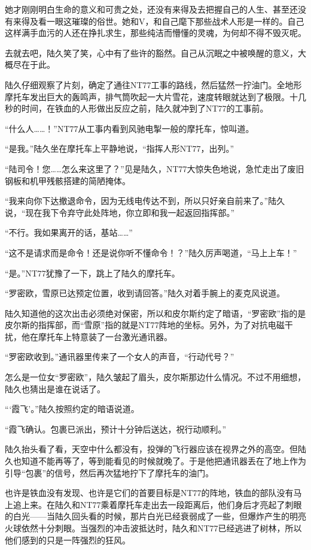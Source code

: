 她才刚刚明白生命的意义和可贵之处，还没有来得及去把握自己的人生、甚至还没有来得及看一眼这璀璨的俗世。她和V，和自己麾下那些战术人形是一样的。自己这样满手血污的人还在挣扎求生，那些纯洁而懵懂的灵魂，为何却不得不毁灭呢。

去就去吧，陆久笑了笑，心中有了些许的豁然。自己从沉眠之中被唤醒的意义，大概尽在于此。

陆久仔细观察了片刻，确定了通往NT77工事的路线，然后猛然一拧油门。全地形摩托车发出巨大的轰鸣声，排气筒吹起一大片雪花，速度转眼就达到了极限。十几秒的时间，在铁血的人形做出反应之前，陆久就冲到了NT77的工事前。

“什么人……！”NT77从工事内看到风驰电掣一般的摩托车，惊叫道。

“是我。”陆久坐在摩托车上平静地说，“指挥人形NT77，出列。”

“陆司令！您……怎么来这里了？”见是陆久，NT77大惊失色地说，急忙走出了废旧钢板和机甲残骸搭建的简陋掩体。

“我来向你下达撤退命令，因为无线电传达不到，所以只好亲自前来了。”陆久说，“现在我下令弃守此处阵地，你立即和我一起返回指挥部。”

“不行。我如果离开的话，基站……”

“这不是请求而是命令！还是说你听不懂命令！？”陆久厉声喝道，“马上上车！”

“是。”NT77犹豫了一下，跳上了陆久的摩托车。

“罗密欧，雪原已达预定位置，收到请回答。”陆久对着手腕上的麦克风说道。

陆久知道他的这次出击必须绝对保密，所以和皮尔斯约定了暗语，“罗密欧”指的是皮尔斯的指挥部，而“雪原”指的就是NT77阵地的坐标。另外，为了对抗电磁干扰，他在摩托车上特意装了一台激光通讯器。

“罗密欧收到。”通讯器里传来了一个女人的声音，“行动代号？”

怎么是一位女“罗密欧”，陆久皱起了眉头，皮尔斯那边什么情况。不过不用细想，陆久也猜出是谁在说话了。

“‘霞飞’。”陆久按照约定的暗语说道。

“霞飞确认。包裹已派出，预计十分钟后送达，祝行动顺利。”

陆久抬头看了看，天空中什么都没有，投弹的飞行器应该在视界之外的高空。但陆久也知道不能再等了，等到能看见的时候就晚了。于是他把通讯器丢在了地上作为引导“包裹”的信号，然后再次猛地拧下了摩托车的油门。

也许是铁血没有发现、也许是它们的首要目标是NT77的阵地，铁血的部队没有马上追上来。在陆久和NT77乘着摩托车走出去一段距离后，他们身后才亮起了刺眼的白光——当陆久回头看的时候，那片白光已经衰弱成了一些，但爆炸产生的明亮火球依然十分刺眼。当强烈的冲击波抵达时，陆久和NT77已经逃进了树林，所以他们感到的只是一阵强烈的狂风。

